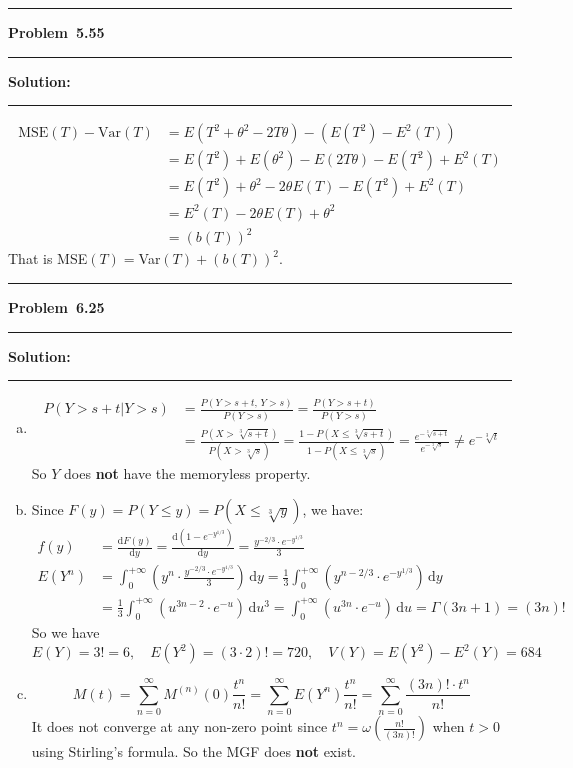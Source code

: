 \documentclass[10.5pt]{article}
\newcommand\question[1]{\vspace{.2in}\hrule\vspace{0.04in}\textbf{Problem\ #1}\vspace{.4em}\hrule\vspace{.10in}}
\newcommand\Solution{\vspace{.3in}\textbf{Solution:}\vspace{.5em}\hrule\vspace{.08in}\par}
\begin{document}
\pagebreak

\question{5.55}
\Solution{}
\begin{align*}
	\text{MSE}(T) - \text{Var}(T) &= E(T^2+\theta^2-2T\theta) - (E(T^2) - E^2(T))\\[8pt]
	&=E(T^2)+E(\theta^2)-E(2T\theta) - E(T^2)+E^2(T)\\[8pt]
	&=E(T^2)+\theta^2-2\theta E(T)-E(T^2)+E^2(T)\\[8pt]
	&=E^2(T)-2\theta E(T)+\theta^2\\[8pt]
	&=(b(T))^2
\end{align*}
That is MSE$(T) = $Var$(T)+(b(T))^2$.




\question{6.25}
\Solution{}
\begin{enumerate}[(a)]
	\item \begin{align*}
		P(Y>s+t|Y>s) &= \frac{P(Y>s+t,\, Y>s)}{P(Y>s)} = \frac{P(Y>s+t)}{P(Y>s)}\\[8pt]
		&= \frac{P(X>\sqrt[3]{s+t})}{P(X>\sqrt[3]{s})}=\frac{1 - P(X\leqslant\sqrt[3]{s+t})}{1 - P(X\leqslant\sqrt[3]{s})}= \frac{e^{-\sqrt[3]{s+t}}}{e^{-\sqrt[3]{s}}}\neq e^{-\sqrt[3]{t}}
\end{align*}
So $Y$ does \textbf{not} have the memoryless property.\vspace{0.2cm}
	\item Since $F(y) = P(Y\leqslant y) = P(X \leqslant \sqrt[3]{y})$, we have:\begin{align*}
		f(y) &= \frac{\mathrm{d} F(y)}{\mathrm{d} y} = \frac{\mathrm{d} (1 - e^{-y^{1/3}})}{\mathrm{d} y} = \frac{y^{-2/3}\cdot e^{-y^{1/3}}}{3}\\[10pt]
		E(Y^n) 
		&= \int_{0}^{+\infty} (y^n\cdot\frac{y^{-2/3}\cdot e^{-y^{1/3}}}{3})\, \mathrm{d}y = \frac{1}{3}\int_{0}^{+\infty} (y^{n - 2/3}\cdot e^{-y^{1/3}})\, \mathrm{d}y\\[8pt]
		&= \frac{1}{3}\int_{0}^{+\infty} (u^{3n - 2}\cdot e^{-u})\, \mathrm{d}u^3 = \int_{0}^{+\infty} (u^{3n}\cdot e^{-u})\, \mathrm{d}u = \Gamma(3n+1) = (3n)!
	\end{align*}
	So we have $E(Y) = 3! = 6,\quad E(Y^2) = (3\cdot2)! = 720,\quad V(Y) = E(Y^2) - E^2(Y) = 684$\vspace{0.2cm}
	\item $$M(t) = \sum_{n = 0}^\infty M^{(n)}(0)\frac{t^n}{n!} = \sum_{n = 0}^\infty E(Y^n)\frac{t^n}{n!} = \sum_{n = 0}^\infty \frac{(3n)!\cdot t^n}{n!}$$
	It does not converge at any non-zero point since $t^n = \omega(\frac{n!}{(3n)!})$ when $t>0$ using Stirling's formula.
	So the MGF does \textbf{not} exist.
\end{enumerate}
\end{document}
